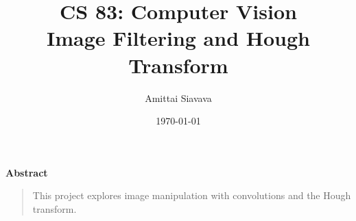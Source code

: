 \title{
  \Huge{CS 83: Computer Vision}\\
  Image Filtering and Hough Transform
}
\date{\Large{\today}}

\begin{titlingpage}

  \author{\Large{Amittai Siavava}}
  \maketitle

  \step
  \begin{center}
    \textbf{Abstract}
  \end{center}
  \step
  \begin{quote}
    \small
    This project explores image manipulation
    with convolutions and the Hough transform. 
  \end{quote}
\end{titlingpage}
